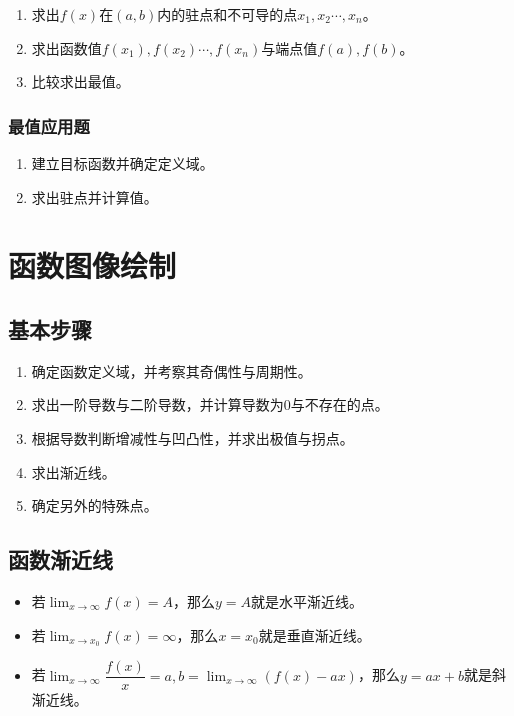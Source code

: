 \documentclass[UTF8, 12pt]{ctexart}
\begin{document}
\begin{enumerate}
    \item 求出$f(x)$在$(a,b)$内的驻点和不可导的点$x_1,x_2\cdots,x_n$。
    \item 求出函数值$f(x_1),f(x_2)\cdots,f(x_n)$与端点值$f(a),f(b)$。
    \item 比较求出最值。
\end{enumerate}

\subsubsection{最值应用题}

\begin{enumerate}
    \item 建立目标函数并确定定义域。
    \item 求出驻点并计算值。
\end{enumerate}

\section{函数图像绘制}

\subsection{基本步骤}

\begin{enumerate}
    \item 确定函数定义域，并考察其奇偶性与周期性。
    \item 求出一阶导数与二阶导数，并计算导数为0与不存在的点。
    \item 根据导数判断增减性与凹凸性，并求出极值与拐点。
    \item 求出渐近线。
    \item 确定另外的特殊点。
\end{enumerate}

\subsection{函数渐近线}

\begin{itemize}
    \item 若$\lim_{x\to\infty}f(x)=A$，那么$y=A$就是水平渐近线。
    \item 若$\lim_{x\to x_0}f(x)=\infty$，那么$x=x_0$就是垂直渐近线。
    \item 若$\lim_{x\to\infty}\dfrac{f(x)}{x}=a,b=\lim_{x\to\infty}(f(x)-ax)$，那么$y=ax+b$就是斜渐近线。
\end{itemize}
\end{document}
